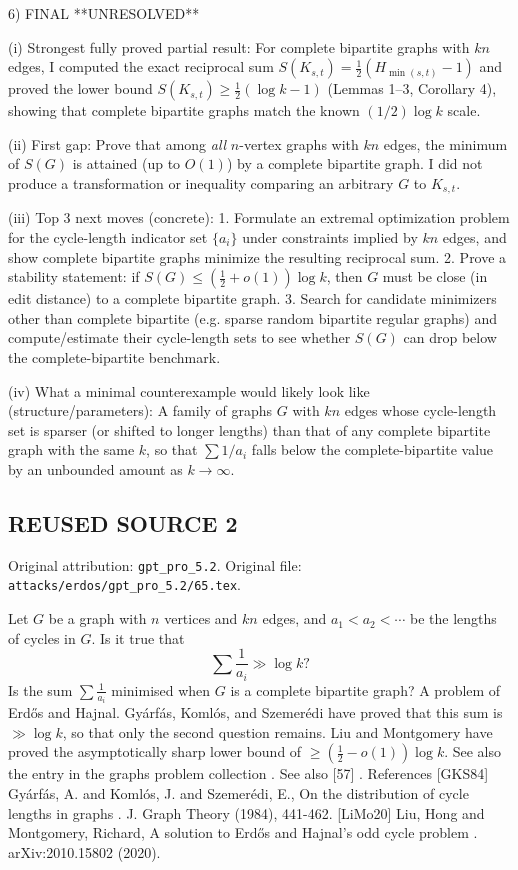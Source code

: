 6) FINAL
**UNRESOLVED**

(i) Strongest fully proved partial result:
For complete bipartite graphs with $kn$ edges, I computed the exact reciprocal sum
$S(K_{s,t})=\frac12(H_{\min(s,t)}-1)$ and proved the lower bound $S(K_{s,t})\ge \frac12(\log k-1)$ (Lemmas 1--3, Corollary 4),
showing that complete bipartite graphs match the known $(1/2)\log k$ scale.

(ii) First gap:
Prove that among \emph{all} $n$-vertex graphs with $kn$ edges, the minimum of $S(G)$ is attained (up to $O(1)$) by a complete bipartite graph.
I did not produce a transformation or inequality comparing an arbitrary $G$ to $K_{s,t}$.

(iii) Top 3 next moves (concrete):
1. Formulate an extremal optimization problem for the cycle-length indicator set $\{a_i\}$ under constraints implied by $kn$ edges, and show complete bipartite graphs minimize the resulting reciprocal sum.
2. Prove a stability statement: if $S(G)\le (\tfrac12+o(1))\log k$, then $G$ must be close (in edit distance) to a complete bipartite graph.
3. Search for candidate minimizers other than complete bipartite (e.g. sparse random bipartite regular graphs) and compute/estimate their cycle-length sets to see whether $S(G)$ can drop below the complete-bipartite benchmark.

(iv) What a minimal counterexample would likely look like (structure/parameters):
A family of graphs $G$ with $kn$ edges whose cycle-length set is sparser (or shifted to longer lengths) than that of any complete bipartite graph with the same $k$,
so that $\sum 1/a_i$ falls below the complete-bipartite value by an unbounded amount as $k\to\infty$.



\subsection*{REUSED SOURCE 2}
Original attribution: \texttt{gpt\_pro\_5.2}.
Original file: \texttt{attacks/erdos/gpt\_pro\_5.2/65.tex}.


Let $G$ be a graph with $n$ vertices and $kn$ edges, and $a_1<a_2<\cdots $ be the lengths of cycles in $G$. Is it true that\[\sum\frac{1}{a_i}\gg \log k?\]Is the sum $\sum\frac{1}{a_i}$ minimised when $G$ is a complete bipartite graph? A problem of Erd\H{o}s and Hajnal. Gy\'{a}rf\'{a}s, Koml\'{o}s, and Szemer\'{e}di \cite{GKS84} have proved that this sum is $\gg \log k$, so that only the second question remains. Liu and Montgomery \cite{LiMo20} have proved the asymptotically sharp lower bound of $\geq (\tfrac{1}{2}-o(1))\log k$. See also the entry in the graphs problem collection . See also [57] . References [GKS84] Gy\'{a}rf\'{a}s, A. and Koml\'{o}s, J. and Szemer\'{e}di, E., On the distribution of cycle lengths in graphs . J. Graph Theory (1984), 441-462. [LiMo20] Liu, Hong and Montgomery, Richard, A solution to Erd\H{o}s and Hajnal's odd cycle problem . arXiv:2010.15802 (2020).

